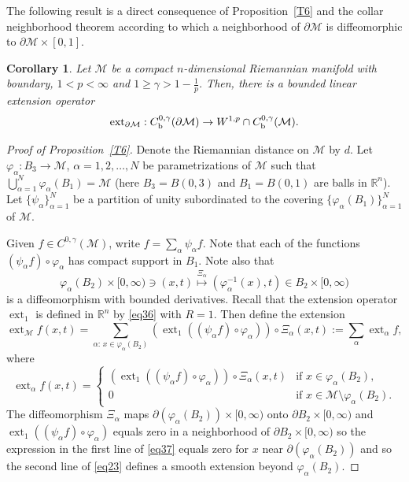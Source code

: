 \documentclass[intlimits,12pt,reqno]{amsart}
\newcommand{\cM}{\mathcal M}
\newcommand{\R}{\mathbb R}
\numberwithin{equation}{section}
\def\ext{\operatorname{ext}}
\newtheorem{corollary}[theorem]{Corollary}
\theoremstyle{definition}
\begin{document}
The following result is a direct consequence of Proposition~\ref{T6} and the collar neighborhood theorem according to which a neighborhood of $\partial\cM$ is diffeomorphic to $\partial\cM\times [0,1]$.
\begin{corollary}
\label{T57}
Let $\cM$ be a compact $n$-dimensional Riemannian manifold with boundary, $1<p<\infty$ and 
$1\geq \gamma> 1-\frac{1}{p}$. Then, there is a bounded linear extension operator
$$
\ext_{\partial\cM}: C_{\rm b}^{0,\gamma}(\partial\cM)\to W^{1,p}\cap C_{\rm b}^{0,\gamma}(\cM).
$$
\end{corollary}
\begin{proof}[Proof of Proposition~\ref{T6}]
Denote the Riemannian distance on $\cM$ by $d$.
Let $\varphi_\alpha:B_3\to\cM$, $\alpha=1,2,\ldots,N$ be parametrizations of $\cM$ such that $\bigcup_{\alpha=1}^N\varphi_\alpha(B_1)=\cM$ (here $B_3=B(0,3)$ and $B_1=B(0,1)$ are balls in $\R^n$). Let $\{\psi_\alpha\}_{\alpha=1}^N$ be a partition of unity subordinated to the covering $\{\varphi_\alpha(B_1)\}_{\alpha=1}^N$ of $\cM$.

Given $f\in C^{0,\gamma}(\cM)$, write $f = \sum_{\alpha}{\psi_\alpha f}$.  Note that each of the functions $(\psi_\alpha f)\circ\varphi_\alpha$ has compact support
in $B_1$. 
Note also that
$$
\varphi_\alpha(B_2)\times [0,\infty)\ni (x,t)\stackrel{\Xi_\alpha}{\longmapsto} (\varphi_\alpha^{-1}(x),t)\in B_2\times [0,\infty)
$$
is a diffeomorphism with bounded derivatives. 
Recall that the extension operator $\ext_1$ is defined in $\R^n$ by \eqref{eq36} with $R=1$.
Then define the extension
$$
\ext_{\cM} f(x,t) = \sum_{\alpha:\, x\in\varphi_\alpha(B_2)}(\ext_1((\psi_\alpha f) \circ \varphi_\alpha))  
\circ\Xi_\alpha(x,t)
:= \sum_\alpha \ext_\alpha f,
$$
where
\begin{equation}
\label{eq37}
\ext_\alpha f(x,t)=
\begin{cases}
(\ext_1((\psi_\alpha f) \circ \varphi_\alpha))\circ\Xi_\alpha(x,t)& \text{if $x\in\varphi_\alpha(B_2)$,}\\
0 & \text{if $x\in \cM\setminus\varphi_\alpha(B_2)$.}
\end{cases}
\end{equation}
The diffeomorphism $\Xi_\alpha$ maps $\partial(\varphi_\alpha(B_2))\times [0,\infty)$ onto $\partial B_2\times [0,\infty)$ and $\ext_1((\psi_\alpha f)\circ\varphi_\alpha)$ equals zero in a neighborhood of 
$\partial B_2\times [0,\infty)$ so the expression in the first line of \eqref{eq37} equals zero for $x$ near $\partial(\varphi_\alpha(B_2))$ and so the second line of \eqref{eq23} defines a smooth extension beyond 
$\varphi_\alpha(B_2)$.


\end{proof}
\end{document}
